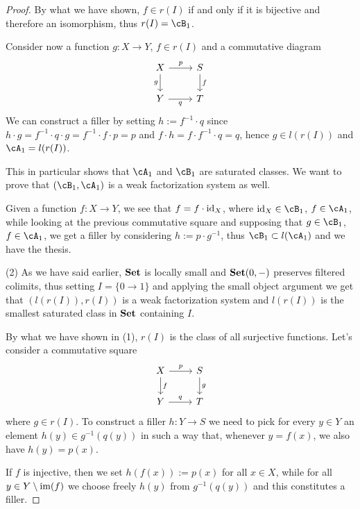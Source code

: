 \documentclass[a4paper,11pt,openany]{scrartcl}
\begin{document}
\begin{proof}
    By what we have shown, $f\in r(I)$ if and only if it is bijective
    and therefore an isomorphism, thus $r(I)=\cB_1$.

    Consider now a function $g\colon X\rightarrow Y$, $f\in r(I)$ and a
    commutative diagram
    \[\begin{tikzcd}
	{X} & {S} \\
	{Y} & {T}
	\arrow["{g}"', from=1-1, to=2-1]
	\arrow["{f}", from=1-2, to=2-2]
	\arrow["{q}"', from=2-1, to=2-2]
	\arrow["{p}", from=1-1, to=1-2]
    \end{tikzcd}\]
    We can construct a filler by setting $h:=f^{-1}\cdot q$ since $h\cdot
    g=f^{-1}\cdot q\cdot g=f^{-1}\cdot f\cdot p=p$ and $f\cdot h=f\cdot
    f^{-1}\cdot q=q$, hence $g\in l(r(I))$ and $\cA_1=l(r(I))$.

    This in particular shows that $\cA_1$ and $\cB_1$ are saturated classes. We
    want to prove that $(\cB_1,\cA_1)$ is a weak factorization system as well.

    Given a function $f\colon X\rightarrow Y$, we see that $f=f\cdot\operatorname{id}_X$,
    where $\id_X\in\cB_1$, $f\in\cA_1$, while looking at the previous
    commutative square and supposing that $g\in\cB_1$, $f\in\cA_1$, we get a
    filler by considering $h:=p\cdot g^{-1}$, thus $\cB_1\subset l(\cA_1)$ and
    we have the thesis.

    (2) As we have said earlier, $\operatorname{\mathbf{Set}}$ is locally small and $\operatorname{\mathbf{Set}}(0,-)$
    preserves filtered colimits, thus setting $I=\{0\rightarrow 1\}$ and
    applying the small object argument we get that $(l(r(I)),r(I))$ is a weak
    factorization system and $l(r(I))$ is the smallest saturated class in $\operatorname{\mathbf{Set}}$
    containing $I$.

    By what we have shown in (1), $r(I)$ is the class of all surjective
    functions. Let's consider a commutative square
    \[
        \begin{tikzcd}
            X\ar[d, "f"]\ar[r, "p"]
            & S\ar[d, "g"] \\
            Y\ar[r, "q"]
            & T
        \end{tikzcd}
    \]
    where $g\in r(I)$. To construct a filler $h\colon Y\rightarrow S$ we need to
    pick for every $y\in Y$ an element $h(y)\in g^{-1}(q(y))$ in such a way that,
    whenever $y=f(x)$, we also have $h(y)=p(x)$.

    \noindent If $f$ is injective, then we
    set $h(f(x)):=p(x)$ for all $x\in X$, while for all $y\in Y\setminus \operatorname{im}(f)$
    we choose freely $h(y)$ from $g^{-1}(q(y))$ and this constitutes a filler.


\end{proof}
\end{document}

